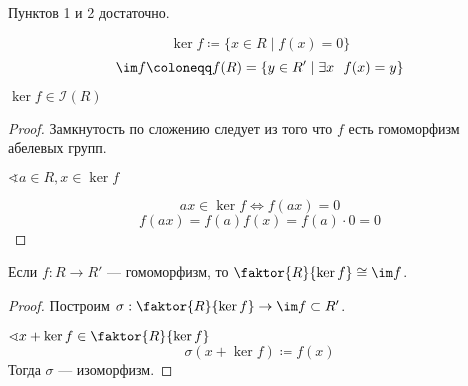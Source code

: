 \begin{remark}
    Пунктов 1 и 2 достаточно.
\end{remark}

\begin{definition}
    \[\ker f \coloneqq \{x \in R \mid f(x) = 0\}\]
    \[\im f \coloneqq f(R) = \{y \in R' \mid \exists x \ \ f(x) = y\}\]
\end{definition}

\begin{lemma}
    \(\ker f \in \mathcal{I}(R)\)
\end{lemma}
\begin{proof}
    Замкнутость по сложению следует из того что \(f\) есть гомоморфизм абелевых групп.

    \(\sphericalangle a \in R, x \in \ker f\)

    \[ax \in \ker f \Leftrightarrow f(ax) = 0\]
    \[f(ax) = f(a)f(x) = f(a) \cdot 0 = 0\]
\end{proof}

\begin{theorem}
    Если \(f : R \to R'\) --- гомоморфизм, то \(\faktor{R}{\ker f} \cong \im f\).
\end{theorem}
\begin{proof}
    Построим \(\sigma : \faktor{R}{\ker f} \to \im f \subset R'\).

    \(\sphericalangle x + \ker f \in \faktor{R}{\ker f}\)
    \[\sigma(x + \ker f) \coloneqq f(x)\]
    Тогда \(\sigma\) --- изоморфизм.
\end{proof}
